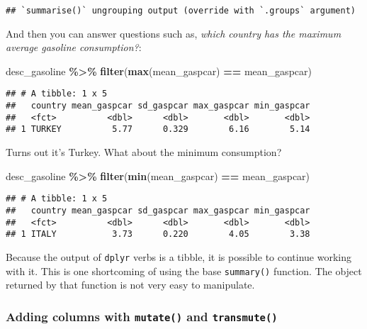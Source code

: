 \documentclass[
]{article}
\newenvironment{Shaded}{\begin{snugshade}}{\end{snugshade}}
\newcommand{\KeywordTok}[1]{\textcolor[rgb]{0.13,0.29,0.53}{\textbf{#1}}}
\newcommand{\NormalTok}[1]{#1}
\newcommand{\OperatorTok}[1]{\textcolor[rgb]{0.81,0.36,0.00}{\textbf{#1}}}
\newcommand{\StringTok}[1]{\textcolor[rgb]{0.31,0.60,0.02}{#1}}
\begin{document}
\begin{verbatim}
## `summarise()` ungrouping output (override with `.groups` argument)
\end{verbatim}

And then you can answer questions such as, \emph{which country has the maximum average gasoline
consumption?}:

\begin{Shaded}
\begin{Highlighting}[]
\NormalTok{desc\_gasoline }\OperatorTok{\%\textgreater{}\%}
\StringTok{  }\KeywordTok{filter}\NormalTok{(}\KeywordTok{max}\NormalTok{(mean\_gaspcar) }\OperatorTok{==}\StringTok{ }\NormalTok{mean\_gaspcar)}
\end{Highlighting}
\end{Shaded}

\begin{verbatim}
## # A tibble: 1 x 5
##   country mean_gaspcar sd_gaspcar max_gaspcar min_gaspcar
##   <fct>          <dbl>      <dbl>       <dbl>       <dbl>
## 1 TURKEY          5.77      0.329        6.16        5.14
\end{verbatim}

Turns out it's Turkey. What about the minimum consumption?

\begin{Shaded}
\begin{Highlighting}[]
\NormalTok{desc\_gasoline }\OperatorTok{\%\textgreater{}\%}
\StringTok{  }\KeywordTok{filter}\NormalTok{(}\KeywordTok{min}\NormalTok{(mean\_gaspcar) }\OperatorTok{==}\StringTok{ }\NormalTok{mean\_gaspcar)}
\end{Highlighting}
\end{Shaded}

\begin{verbatim}
## # A tibble: 1 x 5
##   country mean_gaspcar sd_gaspcar max_gaspcar min_gaspcar
##   <fct>          <dbl>      <dbl>       <dbl>       <dbl>
## 1 ITALY           3.73      0.220        4.05        3.38
\end{verbatim}

Because the output of \texttt{dplyr} verbs is a tibble, it is possible to continue working with it. This
is one shortcoming of using the base \texttt{summary()} function. The object returned by that function
is not very easy to manipulate.

\hypertarget{adding-columns-with-mutate-and-transmute}{%
\subsubsection{\texorpdfstring{Adding columns with \texttt{mutate()} and \texttt{transmute()}}{Adding columns with mutate() and transmute()}}\label{adding-columns-with-mutate-and-transmute}}
\end{document}
